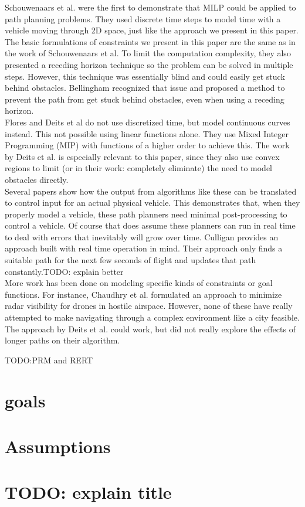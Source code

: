 Schouwenaars et al. \cite{Schouwenaars2001} were the first to demonstrate that MILP could be applied to path planning problems. They used discrete time steps to model time with a vehicle moving through 2D space, just like the approach we present in this paper. The basic formulations of constraints we present in this paper are the same as in the work of Schouwenaars et al. To limit the computation complexity, they also presented a receding horizon technique so the problem can be solved in multiple steps. However, this technique was essentially blind and could easily get stuck behind obstacles. Bellingham\cite{Bellingham2002} recognized that issue and proposed a method to prevent the path from get stuck behind obstacles, even when using a receding horizon. \\

Flores\cite{Flores2007} and Deits et al\cite{Deits2015} do not use discretized time, but model continuous curves instead. This not possible using linear functions alone. They use Mixed Integer Programming (MIP) with functions of a higher order to achieve this. The work by Deits et al. is especially relevant to this paper, since they also use convex regions to limit (or in their work: completely eliminate) the need to model obstacles directly. \\

Several papers \cite{Fliess1995a, Hao2005, Cowling2007, Mellinger2011} show how the output from algorithms like these can be translated to control input for an actual physical vehicle. This demonstrates that, when they properly model a vehicle, these path planners need minimal post-processing to control a vehicle. Of course that does assume these planners can run in real time to deal with errors that inevitably will grow over time. Culligan \cite{Culligan2006} provides an approach built with real time operation in mind. Their approach only finds a suitable path for the next few seconds of flight and updates that path constantly.TODO: explain better \\

More work has been done on modeling specific kinds of constraints or goal functions. For instance, Chaudhry et al. \cite{Chaudhry2004} formulated an approach to minimize radar visibility for drones in hostile airspace. However, none of these have really attempted to make navigating through a complex environment like a city feasible. The approach by Deits et al. \cite{Deits2015} could work, but did not really explore the effects of longer paths on their algorithm.

TODO:PRM and RERT \\


\section{goals}

\section{Assumptions}
\section{TODO: explain title}